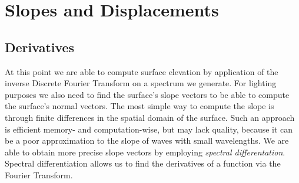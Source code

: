 \section{Slopes and Displacements}
\label{sec:slopes_and_displacements}
\subsection{Derivatives}
At this point we are able to compute surface elevation by application of the
inverse Discrete Fourier Transform on a spectrum we generate. For lighting
purposes we also need to find the surface's slope vectors to be able to compute
the surface's normal vectors. The most simple way to compute the slope is
through finite differences in the spatial domain of the surface. Such an
approach is efficient memory- and computation-wise, but may lack quality,
because it can be a poor approximation to the slope of waves with small
wavelengths. We are able to obtain more precise slope vectors by employing
\emph{spectral differentation}. Spectral differentiation allows us to find
the derivatives of a function via the Fourier Transform.\\


